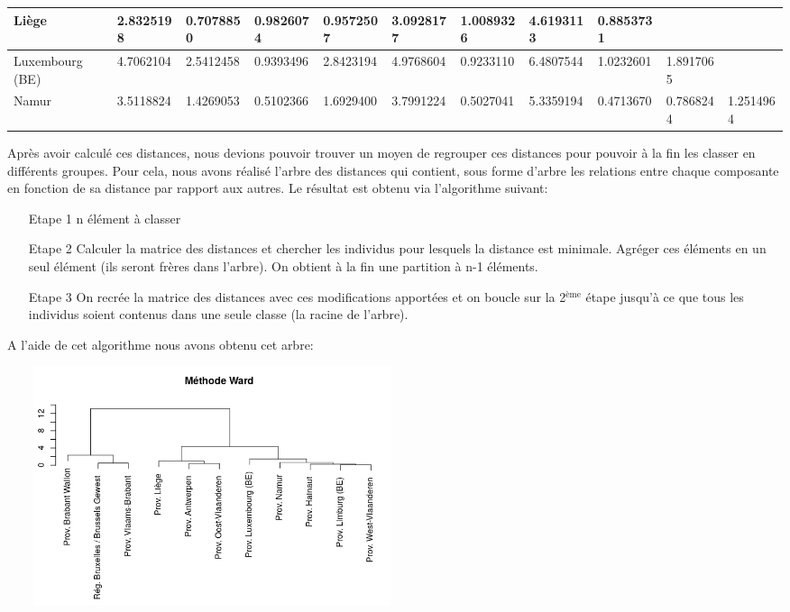 \documentclass{article}
\begin{document}
\begin{tabularx}{19cm}{|X|X|X|X|X|X|X|X|X|X|X|}
	\hline
	Liège                               &2.8325198       &0.7078850          &0.9826074            & 0.9572507            &3.0928177             &1.0089326            &4.6193113     &0.8853731                                  &&\\
	\hline
	Luxembourg (BE)                     &4.7062104       &2.5412458          &0.9393496             &2.8423194            &4.9768604             &0.9233110            &6.4807544     &1.0232601   &1.8917065                      &\\
	\hline
	Namur                         &3.5118824       &1.4269053          &0.5102366             &1.6929400            &3.7991224             &0.5027041            &5.3359194     &0.4713670   &0.7868244             &1.2514964\\
	\hline
\end{tabularx}

Après avoir calculé ces distances, nous devions pouvoir trouver un moyen de regrouper ces distances pour pouvoir à la fin les classer en différents groupes. Pour cela, nous avons réalisé l'arbre des distances qui contient, sous forme d'arbre les relations entre chaque composante en fonction de sa distance par rapport aux autres. Le résultat est obtenu via l'algorithme suivant:

\begin{itemize}
	\item[Etape 1] n élément à classer
	\item[Etape 2] Calculer la matrice des distances et chercher les individus pour lesquels la distance est minimale. 
	Agréger ces éléments en un seul élément (ils seront frères dans l'arbre). On obtient à la fin une partition à n-1 éléments.
	\item[Etape 3] On recrée la matrice des distances avec ces modifications apportées et on boucle sur la 2$^{\text{ème}}$ étape jusqu'à ce que tous les individus soient contenus dans une seule classe (la racine de l'arbre).
\end{itemize}

A l'aide de cet algorithme nous avons obtenu cet arbre:

\includegraphics[width=12cm,height=7cm]{tree}
\end{document}
